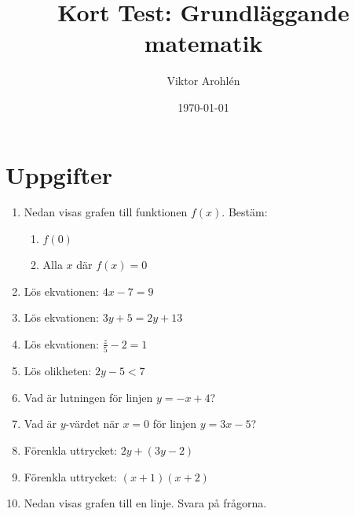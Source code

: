 \documentclass[a4paper,11pt]{article}
\title{Kort Test: Grundläggande matematik}
\author{Viktor Arohlén}
\date{\today}
\begin{document}
\maketitle

\section*{Uppgifter}
\begin{enumerate}[label=\textbf{\arabic*.}]
    \item Nedan visas grafen till funktionen $f(x)$. Bestäm:
    \begin{enumerate}[label=\alph*)]
        \item $f(0)$
        \item Alla $x$ där $f(x) = 0$
    \end{enumerate}
    \begin{center}
    \end{center}
    \item Lös ekvationen: $4x - 7 = 9$
    \item Lös ekvationen: $3y + 5 = 2y + 13$
    \item Lös ekvationen: $\frac{z}{5} - 2 = 1$
    \item Lös olikheten: $2y - 5 < 7$
    \item Vad är lutningen för linjen $y = -x + 4$?
    \item Vad är $y$-värdet när $x = 0$ för linjen $y = 3x - 5$?
    \item Förenkla uttrycket: $2y + (3y - 2)$
    \item Förenkla uttrycket: $(x+1)(x+2)$   
    \newpage
    \item Nedan visas grafen till en linje. Svara på frågorna.
    \begin{center}
\end{center}
\end{enumerate}
\end{document}
